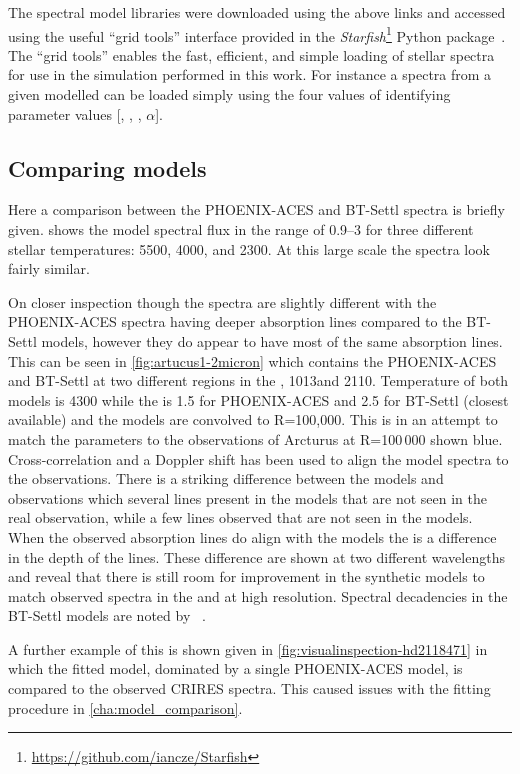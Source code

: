 The spectral model libraries were downloaded using the above links and accessed using the useful ``grid tools'' interface provided in the \emph{Starfish}\footnote{\url{https://github.com/iancze/Starfish}} Python package~\citep{czekala_constructing_2015}.
The ``grid tools'' enables the fast, efficient, and simple loading of stellar spectra for use in the simulation performed in this work.
For instance a spectra from a given modelled can be loaded simply using the four values of identifying parameter values [\txteff, \logg, \feh, $\alpha$].


\subsection{Comparing models}
\label{subsec:phoenix_comparision}
Here a comparison between the {PHOENIX-ACES} and {BT-Settl} spectra is briefly given.
 shows the model spectral flux in the \nir{} range of 0.9--3\um{} for three different stellar temperatures: 5500, 4000, and 2300\K{}.
At this large scale the spectra look fairly similar.

On closer inspection though the spectra are slightly different with the {PHOENIX-ACES} spectra having deeper absorption lines compared to the {BT-Settl} models, however they do appear to have most of the same absorption lines.
This can be seen in \cref{fig:artucus1-2micron} which contains the {PHOENIX-ACES} and {BT-Settl} at two different regions in the \nir, 1013\nm and 2110\nm.
Temperature of both models is 4300\K{} while the \logg{} is 1.5 for {PHOENIX-ACES} and 2.5 for {BT-Settl} (closest available) and the models are convolved to R=100,000.
This is in an attempt to match the parameters to the observations of {Arcturus} at R=100\,000 shown blue.
Cross-correlation and a Doppler shift has been used to align the model spectra to the observations.
There is a striking difference between the models and observations which several lines present in the models that are not seen in the real observation, while a few lines observed that are not seen in the models.
When the observed absorption lines do align with the models the is a difference in the depth of the lines.
These difference are shown at two different wavelengths and reveal that there is still room for improvement in the synthetic models to match observed spectra in the \nir and at high resolution.
Spectral decadencies in the {BT-Settl} models are noted by ~\citet{rajpurohit_effective_2013}.

A further example of this is shown given in \cref{fig:visualinspection-hd2118471} in which the fitted model, dominated by a single {PHOENIX-ACES} model, is compared to the observed CRIRES spectra.
This caused issues with the fitting procedure in \cref{cha:model_comparison}.

